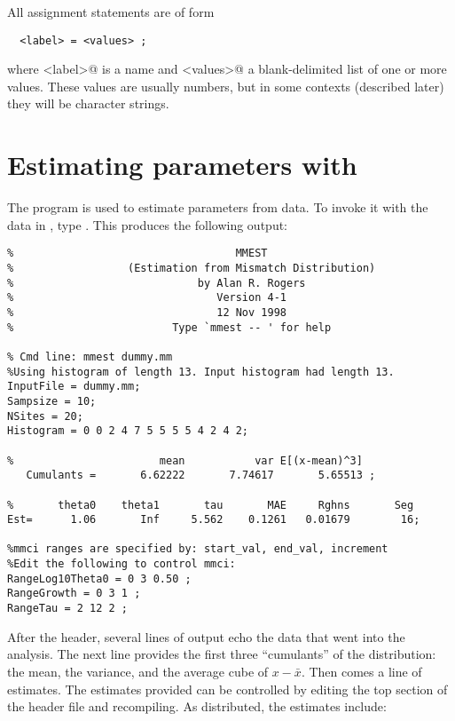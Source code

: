 All assignment statements are of form
\begin{verbatim}
  <label> = <values> ;
\end{verbatim}
where \verb@<label>@ is a name and \verb@<values>@ a blank-delimited
list of one or more values.  These values are usually numbers, but in
some contexts (described later) they will be character strings.

\section{Estimating parameters with }

The program  is used to estimate parameters from data.  To
invoke it with the data in , type .
This produces the following output:
\begin{verbatim}
%                                   MMEST
%                  (Estimation from Mismatch Distribution)
%                             by Alan R. Rogers
%                                Version 4-1
%                                12 Nov 1998
%                         Type `mmest -- ' for help

% Cmd line: mmest dummy.mm
%Using histogram of length 13. Input histogram had length 13.
InputFile = dummy.mm;
Sampsize = 10;
NSites = 20;
Histogram = 0 0 2 4 7 5 5 5 5 4 2 4 2;

%                       mean           var E[(x-mean)^3]
   Cumulants =       6.62222       7.74617       5.65513 ;

%       theta0    theta1       tau       MAE     Rghns       Seg
Est=      1.06       Inf     5.562    0.1261   0.01679        16;

%mmci ranges are specified by: start_val, end_val, increment
%Edit the following to control mmci:
RangeLog10Theta0 = 0 3 0.50 ;
RangeGrowth = 0 3 1 ;
RangeTau = 2 12 2 ;
\end{verbatim}
After the header, several lines of output echo the data that went into
the analysis.  The next line provides the first three ``cumulants'' of
the distribution: the mean, the variance, and the average cube of $x -
\bar x$.  Then comes a line of estimates.  The estimates provided can
be controlled by editing the top section of the header file
 and recompiling.  As distributed, the estimates
include:
